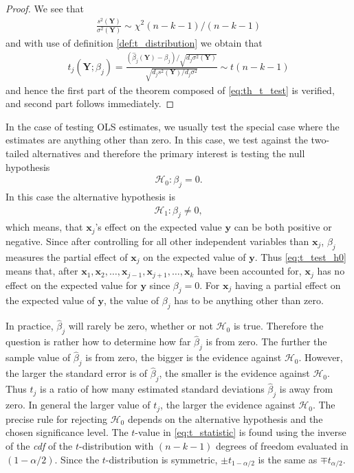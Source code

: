 \begin{proof}
We see that
\begin{align*}
    \frac{s^2(\textbf{Y})}{\sigma^2(\textbf{Y})} \sim \chi^2(n-k-1)/(n-k-1)
\end{align*}
and with use of definition \ref{def:t_distribution} we obtain that
\begin{align*}
    t_j(\textbf{Y};\beta_j)=\frac{(\hat{\beta}_j(\textbf{Y})-\beta_j)/\sqrt{d_j\sigma^2(\textbf{Y})}}{\sqrt{d_js^2(\textbf{Y})/d_j\sigma^2}} \sim t(n-k-1)
\end{align*}
and hence the first part of the theorem composed of \eqref{eq:th_t_test} is verified, and second part follows immediately. 
\end{proof}

In the case of testing OLS estimates, we usually test the special case where the estimates are anything other than zero. In this case, we test against the two-tailed alternatives and therefore the primary interest is testing the null hypothesis
\begin{align} \label{eq:t_test_h0}
    \mathcal{H}_0:\beta_j=0.
\end{align}
In this case the alternative hypothesis is
\begin{align} \label{eq:t_test_ha}
    \mathcal{H}_1 : \beta_j \neq 0,
\end{align}
which means, that $\textbf{x}_j$'s effect on the expected value $\textbf{y}$ can be both positive or negative.
Since after controlling for all other independent variables than $\textbf{x}_j$, $\beta_j$ measures the partial effect of $\textbf{x}_j$ on the expected value of $\textbf{y}$. 
Thus \eqref{eq:t_test_h0} means that, after $\textbf{x}_1,\textbf{x}_2, \ldots, \textbf{x}_{j-1}, \textbf{x}_{j+1}, \ldots, \textbf{x}_k$ have been accounted for, $\textbf{x}_j$ has no effect on the expected value for $\textbf{y}$ since $\beta_j=0$. 
For $\textbf{x}_j$ having a partial effect on the expected value of $\textbf{y}$, the value of $\beta_j$ has to be anything other than zero.

In practice, $\hat{\beta}_j$ will rarely be zero, whether or not $\mathcal{H}_0$ is true.
Therefore the question is rather how to determine how far $\hat{\beta}_j$ is from zero. 
The further the sample value of $\hat{\beta}_j$ is from zero, the bigger is the evidence against $\mathcal{H}_0$. 
However, the larger the standard error is of $\hat{\beta}_j$, the smaller is the evidence against $\mathcal{H}_0$. 
Thus $t_{j}$ is a ratio of how many estimated standard deviations $\hat{\beta}_j$ is away from zero.
In general the larger value of $t_{j}$, the larger the evidence against $\mathcal{H}_0$. 
The precise rule for rejecting $\mathcal{H}_0$ depends on the alternative hypothesis and the chosen significance level.
The $t$-value in \eqref{eq:t_statistic} is found using the inverse of the \textit{cdf} of the $t$-distribution with $(n - k - 1)$ degrees of freedom evaluated in $(1-\alpha/2)$. 
Since the $t$-distribution is symmetric, $\pm t_{1-\alpha/2}$ is the same as $\mp t_{\alpha/2}$.

